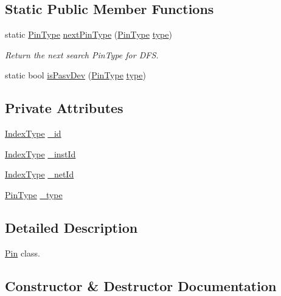 \subsection*{Static Public Member Functions}
\begin{DoxyCompactItemize}
\item 
static \hyperlink{type_8h_afaab50027002ecbb6c8ac27e727d1bb4}{Pin\+Type} \hyperlink{classPin_a86313ccf5cf94894c0d6cece183cb25d}{next\+Pin\+Type} (\hyperlink{type_8h_afaab50027002ecbb6c8ac27e727d1bb4}{Pin\+Type} \hyperlink{classPin_a788397e41a9a4fa196b36f8076eb6d6c}{type})
\begin{DoxyCompactList}\small\item\em Return the next search Pin\+Type for D\+FS. \end{DoxyCompactList}\item 
static bool \hyperlink{classPin_abfab9edd97a71fe12e0bb76ac2ea109a}{is\+Pasv\+Dev} (\hyperlink{type_8h_afaab50027002ecbb6c8ac27e727d1bb4}{Pin\+Type} \hyperlink{classPin_a788397e41a9a4fa196b36f8076eb6d6c}{type})
\end{DoxyCompactItemize}
\subsection*{Private Attributes}
\begin{DoxyCompactItemize}
\item 
\hyperlink{type_8h_a581e8093e28e7362f2b6937296190676}{Index\+Type} \hyperlink{classPin_ad40a8453e8fa16e12e17f661bfc36f69}{\+\_\+id}
\item 
\hyperlink{type_8h_a581e8093e28e7362f2b6937296190676}{Index\+Type} \hyperlink{classPin_aa9bd5211cedd081a572476545f5bf498}{\+\_\+inst\+Id}
\item 
\hyperlink{type_8h_a581e8093e28e7362f2b6937296190676}{Index\+Type} \hyperlink{classPin_a703ff6aea39f28b40e7d5d4dfb708a67}{\+\_\+net\+Id}
\item 
\hyperlink{type_8h_afaab50027002ecbb6c8ac27e727d1bb4}{Pin\+Type} \hyperlink{classPin_a0a660d777203aca04685f4cdf6623f72}{\+\_\+type}
\end{DoxyCompactItemize}


\subsection{Detailed Description}
\hyperlink{classPin}{Pin} class. 

\subsection{Constructor \& Destructor Documentation}
\mbox{\label{classPin_a6fbd67b1c9ed59f0af668f675bbc561f}} 
